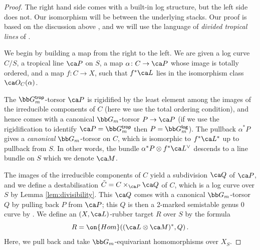\begin{proof}
The right hand side comes with a built-in log structure, but the left side
does not. Our isomorphism will be between the underlying stacks. Our proof is based on the discussion above \cite[]{Marcus2017Logarithmic-com}, and we will use the language of \emph{divided tropical lines} of \cite{Marcus2017Logarithmic-com}.

We begin by building a map from the right to the left. We are given a log curve $C/S$, a tropical line $\ca P$ on $S$, a map $\alpha\colon C\to \ca P$ whose image is totally ordered, and a map $f\colon C \to X$, such that $f^*\ca L$ lies in the isomorphism class $\ca O_C(\alpha)$.

The $\bb G_m^{\mathsf{trop}}$-torsor $\ca P$ is rigidified by the least element among the images of the irreducible components of $C$ (here we use the total ordering condition), and hence comes with a canonical $\bb G_m$-torsor $P \to \ca P$ (if we use the rigidification to identify $\ca P = \bb G_m^{\mathsf{trop}}$ then $P = \bb G_m^{\mathsf{log}}$). The pullback $\alpha^*P$ gives a \emph{canonical} $\bb G_m$-torsor on $C$, which is isomorphic to $f^*\ca L^*$ up to pullback from $S$. In other words, the bundle $\alpha^*P \otimes f^*\ca L^\vee$ descends to a line bundle on $S$ which we denote $\ca M$.

The images of the irreducible components of $C$ yield a subdivision $\ca Q$ of $\ca P$, and we define a destabilisation $\tilde C = C \times_{\ca P}\ca Q$ of $C$, which is a log curve over $S$ by Lemma \ref{lem:divisibility}. This $\ca Q$ comes with a canonical $\bb G_m$-torsor $Q$ by pulling back $P$ from $\ca P$; this $Q$ is then a 2-marked semistable genus 0 curve by \cite[]{Marcus2017Logarithmic-com}. We define an $(X, \ca L)$-rubber target $R$ over $S$ by the formula
$$ R = \on{Hom}((\ca L \otimes \ca M)^*, Q)\,. $$
Here, we pull back %
and take $\bb G_m$-equivariant homomorphisms over $X_S$.



\end{proof}
